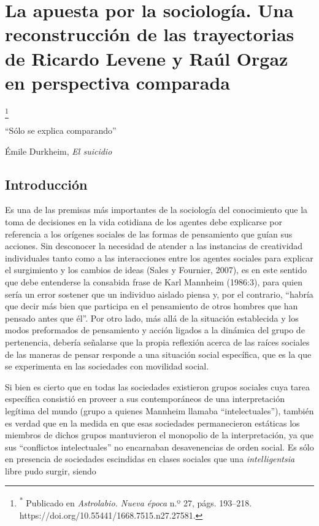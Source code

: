 \mainmatter

\chapter{La apuesta por la sociología. Una reconstrucción de las trayectorias de Ricardo Levene y Raúl Orgaz en perspectiva comparada}

\footnote{\textsuperscript{*} Publicado en \emph{Astrolabio. Nueva época} n.º 27, págs. 193--218. https://doi.org/10.55441/1668.7515.n27.27581.}

``Sólo se explica comparando''

Émile Durkheim, \emph{El suicidio}

\section{Introducción}

Es una de las premisas más importantes de la sociología del conocimiento que la toma de decisiones en la vida cotidiana de los agentes debe explicarse por referencia a los orígenes sociales de las formas de pensamiento que guían sus acciones. Sin desconocer la necesidad de atender a las instancias de creatividad individuales tanto como a las interacciones entre los agentes sociales para explicar el surgimiento y los cambios de ideas (Sales y Fournier, 2007), es en este sentido que debe entenderse la consabida frase de Karl Mannheim (1986:3), para quien sería un error sostener que un individuo aislado piensa y, por el contrario, ``habría que decir más bien que participa en el pensamiento de otros hombres que han pensado antes que él''. Por otro lado, más allá de la situación establecida y los modos preformados de pensamiento y acción ligados a la dinámica del grupo de pertenencia, debería señalarse que la propia reflexión acerca de las raíces sociales de las maneras de pensar responde a una situación social específica, que es la que se experimenta en las sociedades con movilidad social.

Si bien es cierto que en todas las sociedades existieron grupos sociales cuya tarea específica consistió en proveer a sus contemporáneos de una interpretación legítima del mundo (grupo a quienes Mannheim llamaba ``intelectuales''), también es verdad que en la medida en que esas sociedades permanecieron estáticas los miembros de dichos grupos mantuvieron el monopolio de la interpretación, ya que sus ``conflictos intelectuales'' no encarnaban desavenencias de orden social. Es sólo en presencia de sociedades escindidas en clases sociales que una \emph{intelligentsia} libre pudo surgir, siendo

